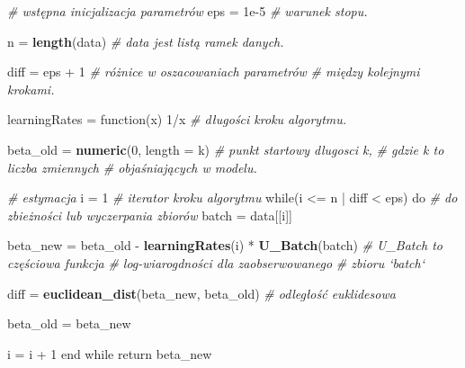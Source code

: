 \documentclass[]{article}
\newenvironment{Shaded}{\begin{snugshade}}{\end{snugshade}}
\newcommand{\KeywordTok}[1]{\textcolor[rgb]{0.13,0.29,0.53}{\textbf{{#1}}}}
\newcommand{\DataTypeTok}[1]{\textcolor[rgb]{0.13,0.29,0.53}{{#1}}}
\newcommand{\DecValTok}[1]{\textcolor[rgb]{0.00,0.00,0.81}{{#1}}}
\newcommand{\FloatTok}[1]{\textcolor[rgb]{0.00,0.00,0.81}{{#1}}}
\newcommand{\StringTok}[1]{\textcolor[rgb]{0.31,0.60,0.02}{{#1}}}
\newcommand{\CommentTok}[1]{\textcolor[rgb]{0.56,0.35,0.01}{\textit{{#1}}}}
\newcommand{\NormalTok}[1]{{#1}}
\begin{document}
\begin{Shaded}
\begin{Highlighting}[]
                    \CommentTok{# wstępna inicjalizacja parametrów}
\NormalTok{eps =}\StringTok{ }\FloatTok{1e-5}                               \CommentTok{# warunek stopu.}

\NormalTok{n =}\StringTok{ }\KeywordTok{length}\NormalTok{(data)                         }\CommentTok{# data jest listą ramek danych.}

\NormalTok{diff =}\StringTok{ }\NormalTok{eps +}\StringTok{ }\DecValTok{1}                           \CommentTok{# różnice w oszacowaniach parametrów}
                                         \CommentTok{# między kolejnymi krokami.}

\NormalTok{learningRates =}\StringTok{ }\NormalTok{function(x) }\DecValTok{1}\NormalTok{/x          }\CommentTok{# długości kroku algorytmu.}

\NormalTok{beta_old =}\StringTok{ }\KeywordTok{numeric}\NormalTok{(}\DecValTok{0}\NormalTok{, }\DataTypeTok{length =} \NormalTok{k)        }\CommentTok{# punkt startowy dlugosci k,}
                                         \CommentTok{# gdzie k to liczba zmiennych}
                                         \CommentTok{# objaśniających w modelu.}

                              \CommentTok{# estymacja}
\NormalTok{i =}\StringTok{ }\DecValTok{1}                                    \CommentTok{# iterator kroku algorytmu}
\NormalTok{while(i <=}\StringTok{ }\NormalTok{n |}\StringTok{ }\NormalTok{diff <}\StringTok{ }\NormalTok{eps) do            }\CommentTok{# do zbieżności lub wyczerpania zbiorów}
  \NormalTok{batch =}\StringTok{ }\NormalTok{data[[i]]}
  
  \NormalTok{beta_new =}\StringTok{ }\NormalTok{beta_old -}\StringTok{ }\KeywordTok{learningRates}\NormalTok{(i) *}\StringTok{ }\KeywordTok{U_Batch}\NormalTok{(batch) }
                                         \CommentTok{# U_Batch to częściowa funkcja}
                                         \CommentTok{# log-wiarogdności dla zaobserwowanego}
                                         \CommentTok{# zbioru `batch`}
  
  \NormalTok{diff =}\StringTok{ }\KeywordTok{euclidean_dist}\NormalTok{(beta_new, beta_old) }\CommentTok{# odległość euklidesowa}
  
  \NormalTok{beta_old =}\StringTok{ }\NormalTok{beta_new }
  
  \NormalTok{i =}\StringTok{ }\NormalTok{i +}\StringTok{ }\DecValTok{1}
\NormalTok{end while}
\NormalTok{return beta_new}
\end{Highlighting}
\end{Shaded}
\end{document}
